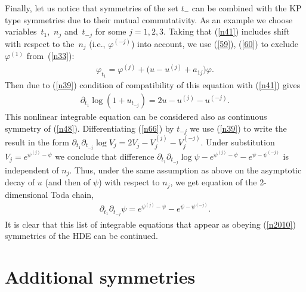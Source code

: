 \documentclass[pdftex]{sigma}
\numberwithin{equation}{section}
\begin{document}
Finally, let us notice that symmetries of the set $t_{-}$ can be combined with the KP type symmetries due to their mutual commutativity. As an example we choose variables~$t_{1}$,~$n_j$ and~$t_{-j}$ for some $j=1,2,3$. Taking that (\ref{n41}) includes shift with respect to the~$n_j$ (i.e., $\varphi^{(-j)}$) into account, we use (\ref{59}), (\ref{60}) to exclude~$\varphi^{(1)}$ from~(\ref{n33}):
\begin{gather*}
 \varphi_{t_1}=\varphi^{(j)}+\big(u-u^{(j)}+a_{1j}\big)\varphi.%
\end{gather*}
Then due to (\ref{n39}) condition of compatibility of this equation with (\ref{n41}) gives
\begin{gather}
 \partial_{t_1}\log(1+u_{t_{-j}})=2u-u^{(j)}-u^{(-j)}.\label{n66}
\end{gather}
This nonlinear integrable equation can be considered also as continuous symmetry of (\ref{n48}). Dif\/ferentiating (\ref{n66})
by $t_{-j}$ we use (\ref{n39}) to write the result in the form
$\partial_{t_1}\partial_{t_{-j}}\log{V}_{j}=2V_{j}^{}-V_{j}^{(j)}-V_{j}^{(-j)}$. Under substitution
$V_{j}=e^{\psi^{(j)}-\psi}$ we conclude that dif\/ference
$\partial_{t_1}\partial_{t_{-j}}\log\psi-e^{\psi^{(j)}-\psi}-e^{\psi-\psi^{(-j)}}$ is independent of $n_j$. Thus, under the
same assumption as above on the asymptotic decay of $u$ (and then of $\psi$) with respect to $n_j$, we get equation of the
2-dimensional Toda chain,
\begin{gather*}
\partial_{t_1}\partial_{t_{-j}}\psi=e^{\psi^{(j)}-\psi}-e^{\psi-\psi^{(-j)}}.%
\end{gather*}
It is clear that this list of integrable equations that appear as obeying (\ref{n2010}) symmetries of the HDE can be continued.

\section{Additional symmetries}\label{add}
\end{document}
